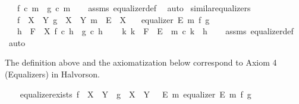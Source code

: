 \begin{isabellebody}
\ \ \ {\isachardoublequoteopen}f\ {\isasymcirc}\isactrlsub c\ m\ {\isacharequal}{\kern0pt}\ g\ {\isasymcirc}\isactrlsub c\ m{\isachardoublequoteclose}\isanewline
%
\isadelimproof
\ \ %
\endisadelimproof
%
\isatagproof
{}\isamarkupfalse%
\ assms\ equalizer{\isacharunderscore}{\kern0pt}def{}\ \isamarkupfalse%
\ auto%
\endisatagproof
{\isafoldproof}%
%
\isadelimproof
\isanewline
%
\endisadelimproof
\isanewline
{}\isamarkupfalse%
\ similar{\isacharunderscore}{\kern0pt}equalizers{\isacharcolon}{\kern0pt}\isanewline
\ \ \ {\isachardoublequoteopen}f\ {\isacharcolon}{\kern0pt}\ X\ {\isasymrightarrow}\ Y{\isachardoublequoteclose}\ {\isachardoublequoteopen}g\ {\isacharcolon}{\kern0pt}\ X\ {\isasymrightarrow}\ Y{\isachardoublequoteclose}\ {\isachardoublequoteopen}m\ {\isacharcolon}{\kern0pt}\ E\ {\isasymrightarrow}\ X{\isachardoublequoteclose}\isanewline
\ \ \ {\isachardoublequoteopen}equalizer\ E\ m\ f\ g{\isachardoublequoteclose}\isanewline
\ \ \ {\isachardoublequoteopen}h\ {\isacharcolon}{\kern0pt}\ F\ {\isasymrightarrow}\ X{\isachardoublequoteclose}\ {\isachardoublequoteopen}f\ {\isasymcirc}\isactrlsub c\ h\ {\isacharequal}{\kern0pt}\ g\ {\isasymcirc}\isactrlsub c\ h{\isachardoublequoteclose}\isanewline
\ \ \ {\isachardoublequoteopen}{\isasymexists}{\isacharbang}{\kern0pt}\ k{\isachardot}{\kern0pt}\ k\ {\isacharcolon}{\kern0pt}\ F\ {\isasymrightarrow}\ E\ {\isasymand}\ m\ {\isasymcirc}\isactrlsub c\ k\ {\isacharequal}{\kern0pt}\ h{\isachardoublequoteclose}\isanewline
%
\isadelimproof
\ \ %
\endisadelimproof
%
\isatagproof
{}\isamarkupfalse%
\ assms\ equalizer{\isacharunderscore}{\kern0pt}def{}\ \isamarkupfalse%
\ auto%
\endisatagproof
{\isafoldproof}%
%
\isadelimproof
%
\endisadelimproof
%
\begin{isamarkuptext}%
The definition above and the axiomatization below correspond to Axiom 4 (Equalizers) in Halvorson.%
\end{isamarkuptext}\isamarkuptrue%
\isamarkupfalse%
\ \isanewline
\ \ equalizer{\isacharunderscore}{\kern0pt}exists{\isacharcolon}{\kern0pt}\ {\isachardoublequoteopen}f\ {\isacharcolon}{\kern0pt}\ X\ {\isasymrightarrow}\ Y\ {\isasymLongrightarrow}\ g\ {\isacharcolon}{\kern0pt}\ X\ {\isasymrightarrow}\ Y\ {\isasymLongrightarrow}\ {\isasymexists}\ E\ m{\isachardot}{\kern0pt}\ equalizer\ E\ m\ f\ g{\isachardoublequoteclose}\isanewline
\isanewline

\end{isabellebody}
